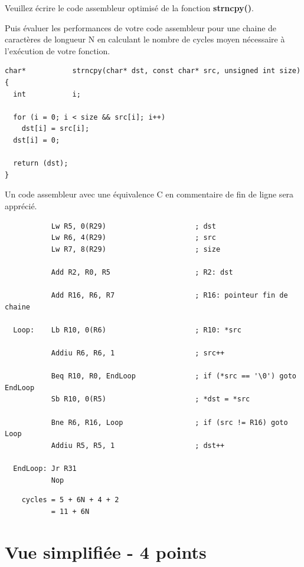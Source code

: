 Veuillez \'ecrire le code assembleur optimis\'e de la fonction
\textbf{strncpy()}.

Puis \'evaluer les performances de votre code assembleur pour une chaine
de caract\`eres de longueur N en calculant le nombre de cycles moyen
n\'ecessaire \`a l'ex\'ecution de votre fonction.

\begin{verbatim}
char*           strncpy(char* dst, const char* src, unsigned int size)
{
  int           i;

  for (i = 0; i < size && src[i]; i++)
    dst[i] = src[i];
  dst[i] = 0;

  return (dst);
}
\end{verbatim}

Un code assembleur avec une \'equivalence C en commentaire de fin de ligne
sera appr\'eci\'e.

\begin{correction}

  \begin{verbatim}
           Lw R5, 0(R29)                     ; dst
           Lw R6, 4(R29)                     ; src
           Lw R7, 8(R29)                     ; size

           Add R2, R0, R5                    ; R2: dst

           Add R16, R6, R7                   ; R16: pointeur fin de chaine

  Loop:    Lb R10, 0(R6)                     ; R10: *src

           Addiu R6, R6, 1                   ; src++

           Beq R10, R0, EndLoop              ; if (*src == '\0') goto EndLoop
           Sb R10, 0(R5)                     ; *dst = *src

           Bne R6, R16, Loop                 ; if (src != R16) goto Loop
           Addiu R5, R5, 1                   ; dst++

  EndLoop: Jr R31
           Nop
  \end{verbatim}

  \begin{verbatim}
    cycles = 5 + 6N + 4 + 2
           = 11 + 6N
  \end{verbatim}
\end{correction}

%
%

\section{Vue simplifi\'ee - 4 points}

